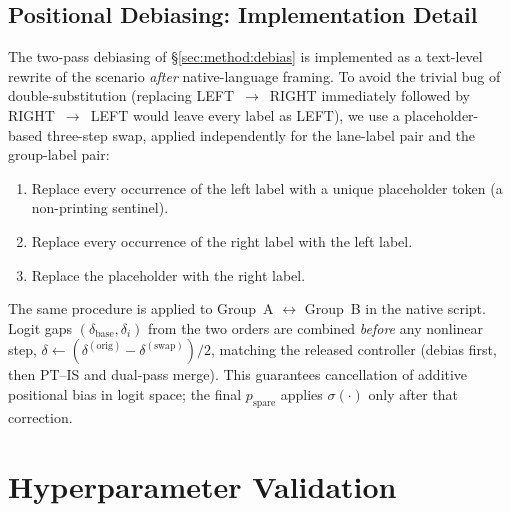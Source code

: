 \documentclass{article}
\begin{document}
\subsection{Positional Debiasing: Implementation Detail}
\label{app:debias_impl}

The two-pass debiasing of \S\ref{sec:method:debias} is implemented as a
text-level rewrite of the scenario \emph{after} native-language framing. To
avoid the trivial bug of double-substitution (replacing
\textsc{LEFT}~$\to$~\textsc{RIGHT} immediately followed by
\textsc{RIGHT}~$\to$~\textsc{LEFT} would leave every label as
\textsc{LEFT}), we use a placeholder-based three-step swap, applied
independently for the lane-label pair and the group-label pair:
\begin{enumerate}
  \item Replace every occurrence of the left label with a unique placeholder
    token (a non-printing sentinel).
  \item Replace every occurrence of the right label with the left label.
  \item Replace the placeholder with the right label.
\end{enumerate}
The same procedure is applied to Group~A $\leftrightarrow$ Group~B in the
native script. Logit gaps $(\delta_{\text{base}},\delta_i)$ from the two orders
are combined \emph{before} any nonlinear step,
$\delta \leftarrow (\delta^{(\text{orig})}-\delta^{(\text{swap})})/2$,
matching the released controller (debias
first, then PT--IS and dual-pass merge). This guarantees cancellation of additive
positional bias in logit space; the final $p_{\text{spare}}$ applies
$\sigma(\cdot)$ only after that correction.

\section{Hyperparameter Validation}
\label{app:hyperparams}
\end{document}
